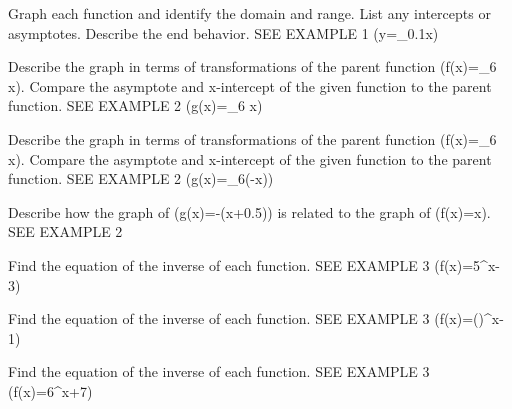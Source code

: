 \documentclass{article}
\newenvironment{practice}[2]{}{}        %
\newcommand{\answer}[1]{}               %
\newcommand{\placeholder}[2]{}          %
\begin{document}
\begin{practice}{17}{2}
Graph each function and identify the domain and range. List any intercepts or asymptotes. Describe the end behavior. SEE EXAMPLE 1
(y=\log_{0.1}x)
\answer{domain: (\{x\mid x>0\}); range: all real numbers; intercept: x-intercept 1; asymptote: y-axis; end behavior: As (x\to0), (y\to\infty). As (x\to\infty), (y\to-\infty).}
\placeholder{graph}{Red decreasing y=log_{0.1} x. Square grid x=-10 to90 step10, y=-4 to1 step0.5; labels x,y,O,x=20,40,60,80,y=-1,-2,-3; axes arrowed. Curve approaches y-axis upward, crosses x-axis at1, passes (10,-1), right arrow near (90,-1.95). No markers.}
\end{practice}
\begin{practice}{18}{2}
Describe the graph in terms of transformations of the parent function (f(x)=\log_6 x). Compare the asymptote and x-intercept of the given function to the parent function. SEE EXAMPLE 2
(g(x)=\log_6 x)
\answer{vertical shrink of (\frac12); asymptote: y-axis (same as parent function); x-intercept 1 (same as parent function)}
\end{practice}
\begin{practice}{19}{1}
Describe the graph in terms of transformations of the parent function (f(x)=\log_6 x). Compare the asymptote and x-intercept of the given function to the parent function. SEE EXAMPLE 2
(g(x)=\log_6(-x))
\answer{reflection over the y-axis; asymptote: y-axis (same as parent function); x-intercept (-1) (different from parent function)}
\end{practice}
\begin{practice}{20}{1}
Describe how the graph of (g(x)=-\ln(x+0.5)) is related to the graph of (f(x)=\ln x). SEE EXAMPLE 2
\answer{Reflection of (f(x)) shifted 0.5 units to the left.}
\end{practice}
\begin{practice}{21}{1}
Find the equation of the inverse of each function. SEE EXAMPLE 3
(f(x)=5^{x-3})
\answer{(f^{-1}(x)=\log_5 x+3)}
\end{practice}
\begin{practice}{22}{1}
Find the equation of the inverse of each function. SEE EXAMPLE 3
(f(x)=()^{x-1})
\answer{(f^{-1}(x)=\log_{\frac12}x+1)}
\end{practice}
\begin{practice}{23}{1}
Find the equation of the inverse of each function. SEE EXAMPLE 3
(f(x)=6^{x+7})
\answer{(f^{-1}(x)=\log_6 x-7)}
\end{practice}
\end{document}
